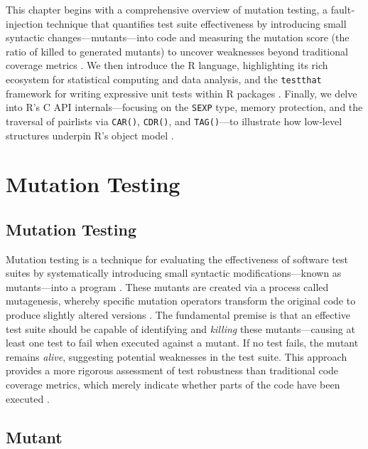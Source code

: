 
\begin{chapterabstract}
This chapter begins with a comprehensive overview of mutation testing, a fault‐injection technique that quantifies test suite effectiveness by introducing small syntactic changes—mutants—into code and measuring the mutation score (the ratio of killed to generated mutants) to uncover weaknesses beyond traditional coverage metrics \cite{jia2011analysis,offutt1996practical,petrovic2018industrial}. We then introduce the R language, highlighting its rich ecosystem for statistical computing and data analysis, and the \texttt{testthat} framework for writing expressive unit tests within R packages \cite{rcore2024,wickham2011testthat}. Finally, we delve into R’s C API internals—focusing on the \texttt{SEXP} type, memory protection, and the traversal of pairlists via \texttt{CAR()}, \texttt{CDR()}, and \texttt{TAG()}—to illustrate how low‐level structures underpin R’s object model \cite{hadley-r-internals-pairlists}.  

\end{chapterabstract}

\section{Mutation Testing}

\subsection{Mutation Testing}

Mutation testing is a technique for evaluating the effectiveness of software test suites by systematically introducing small syntactic modifications—known as mutants—into a program \cite{jia2011analysis}. These mutants are created via a process called mutagenesis, whereby specific mutation operators transform the original code to produce slightly altered versions \cite{offutt1996practical}. The fundamental premise is that an effective test suite should be capable of identifying and \textit{killing} these mutants—causing at least one test to fail when executed against a mutant. If no test fails, the mutant remains \textit{alive}, suggesting potential weaknesses in the test suite. This approach provides a more rigorous assessment of test robustness than traditional code coverage metrics, which merely indicate whether parts of the code have been executed \cite{petrovic2018industrial}.

\subsection{Mutant}

